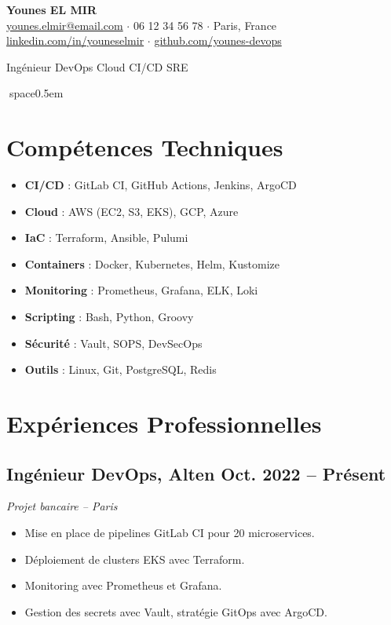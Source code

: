 \documentclass[a4paper,10pt]{article}
\begin{document}
\begin{center}
    {\LARGE \textbf{Younes EL MIR}} \\[4pt]
    \href{mailto:younes.elmir@email.com}{younes.elmir@email.com} $\cdot$ 06 12 34 56 78 $\cdot$ Paris, France \\
    \href{https://linkedin.com/in/youneselmir}{linkedin.com/in/youneselmir} $\cdot$ \href{https://github.com/younes-devops}{github.com/younes-devops}
\end{center}

\begin{center}
    \textcolor{mygray}{\large Ingénieur DevOps \textbar{} Cloud \textbar{} CI/CD \textbar{} SRE}
\end{center}

space{0.5em}

\section*{Compétences Techniques}
\begin{multicols}{2}
\begin{itemize}[leftmargin=*]
    \item \textbf{CI/CD} : GitLab CI, GitHub Actions, Jenkins, ArgoCD
    \item \textbf{Cloud} : AWS (EC2, S3, EKS), GCP, Azure
    \item \textbf{IaC} : Terraform, Ansible, Pulumi
    \item \textbf{Containers} : Docker, Kubernetes, Helm, Kustomize
    \item \textbf{Monitoring} : Prometheus, Grafana, ELK, Loki
    \item \textbf{Scripting} : Bash, Python, Groovy
    \item \textbf{Sécurité} : Vault, SOPS, DevSecOps
    \item \textbf{Outils} : Linux, Git, PostgreSQL, Redis
\end{itemize}
\end{multicols}

\section*{Expériences Professionnelles}

\subsection{Ingénieur DevOps, Alten \hfill Oct. 2022 -- Présent}
\textit{Projet bancaire – Paris}
\begin{itemize}[leftmargin=*]
    \item Mise en place de pipelines GitLab CI pour 20 microservices.
    \item Déploiement de clusters EKS avec Terraform.
    \item Monitoring avec Prometheus et Grafana.
    \item Gestion des secrets avec Vault, stratégie GitOps avec ArgoCD.
\end{itemize}
\end{document}

